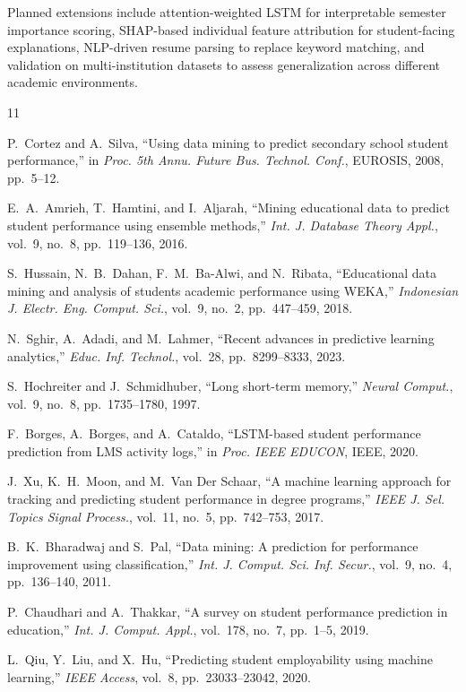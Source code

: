 \documentclass[conference]{IEEEtran}
\begin{document}
Planned extensions include attention-weighted LSTM for
interpretable semester importance scoring, SHAP-based individual feature attribution for student-facing explanations,
NLP-driven resume parsing to replace keyword matching, and
validation on multi-institution datasets to assess generalization
across different academic environments.
\begin{thebibliography}{11}

P.~Cortez and A.~Silva, ``Using data mining to predict secondary school student performance,'' in \textit{Proc. 5th Annu. Future Bus. Technol. Conf.}, EUROSIS, 2008, pp.~5--12.

E.~A.~Amrieh, T.~Hamtini, and I.~Aljarah, ``Mining educational data to predict student performance using ensemble methods,'' \textit{Int. J. Database Theory Appl.}, vol.~9, no.~8, pp.~119--136, 2016.

S.~Hussain, N.~B.~Dahan, F.~M.~Ba-Alwi, and N.~Ribata, ``Educational data mining and analysis of students academic performance using WEKA,'' \textit{Indonesian J. Electr. Eng. Comput. Sci.}, vol.~9, no.~2, pp.~447--459, 2018.

N.~Sghir, A.~Adadi, and M.~Lahmer, ``Recent advances in predictive learning analytics,'' \textit{Educ. Inf. Technol.}, vol.~28, pp.~8299--8333, 2023.

S.~Hochreiter and J.~Schmidhuber, ``Long short-term memory,'' \textit{Neural Comput.}, vol.~9, no.~8, pp.~1735--1780, 1997.

F.~Borges, A.~Borges, and A.~Cataldo, ``LSTM-based student performance prediction from LMS activity logs,'' in \textit{Proc. IEEE EDUCON}, IEEE, 2020.

J.~Xu, K.~H.~Moon, and M.~Van Der Schaar, ``A machine learning approach for tracking and predicting student performance in degree programs,'' \textit{IEEE J. Sel. Topics Signal Process.}, vol.~11, no.~5, pp.~742--753, 2017.

B.~K.~Bharadwaj and S.~Pal, ``Data mining: A prediction for performance improvement using classification,'' \textit{Int. J. Comput. Sci. Inf. Secur.}, vol.~9, no.~4, pp.~136--140, 2011.

P.~Chaudhari and A.~Thakkar, ``A survey on student performance prediction in education,'' \textit{Int. J. Comput. Appl.}, vol.~178, no.~7, pp.~1--5, 2019.

L.~Qiu, Y.~Liu, and X.~Hu, ``Predicting student employability using machine learning,'' \textit{IEEE Access}, vol.~8, pp.~23033--23042, 2020.


\end{thebibliography}
\end{document}
